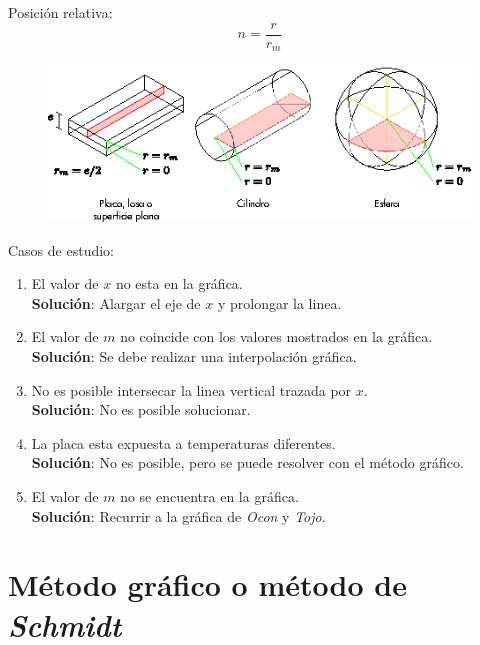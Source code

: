 Posición relativa:
\begin{equation*}
    n = \frac{r}{r_m}
\end{equation*}

\begin{figure}[!h]
\centering
\includegraphics[scale=2.35]{figura03_07.eps}
\end{figure}

Casos de estudio:

\begin{enumerate}
    \item El valor de $x$ no esta en la gráfica.\\
    \textbf{Solución}: Alargar el eje de $x$ y prolongar la linea.
    \item El valor de $m$ no coincide con los valores mostrados en la gráfica.\\
    \textbf{Solución}: Se debe realizar una interpolación gráfica.
    \item No es posible intersecar la linea vertical trazada por $x$.\\
    \textbf{Solución}: No es posible solucionar.
    \item La placa esta expuesta a temperaturas diferentes.\\
    \textbf{Solución}: No es posible, pero se puede resolver con el método
    gráfico.
    \item El valor de $m$ no se encuentra en la gráfica.\\
    \textbf{Solución}: Recurrir a la gráfica de \emph{Ocon} y \emph{Tojo}.
\end{enumerate}

\section{Método gráfico o método de \emph{Schmidt}}

